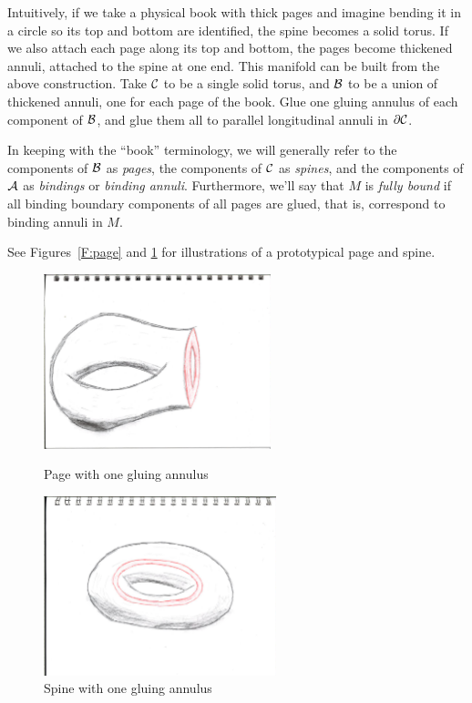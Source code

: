 Intuitively, if we take a physical book with thick pages and imagine bending it
in a circle so its top and bottom are identified, the spine becomes a solid
torus.  If we also attach each page along its top and bottom, the pages become
thickened annuli, attached to the spine at one end. This manifold can be built
from the above construction. Take $\mathcal{C}$ to be a single solid torus, and $\mathcal{B}$
to be a union of thickened annuli, one for each page of the book. Glue one
gluing annulus of each component of $\mathcal{B}$, and glue them all to parallel
longitudinal annuli in $\partial \mathcal{C}$.

\begin{defn}

In keeping with the ``book'' terminology, we will generally refer to the
components of $\mathcal{B}$ as \emph{pages}, the components of $\mathcal{C}$ as \emph{spines},
and the components of $\mathcal{A}$ as \emph{bindings} or \emph{binding annuli}.
Furthermore, we'll say that $M$ is \emph{fully bound} if all binding boundary
components of all pages are glued, that is, correspond to binding annuli in
$M$.

\end{defn}

See Figures~\ref{F:page} and \ref{F:spine} for illustrations of a prototypical
page and spine.

\begin{figure}
\noindent
    \begin{minipage}{0.45\textwidth}
        \noindent
        \includegraphics[width=\textwidth,height=2in]{fig-page}
        \caption{Page with one gluing annulus}
        \label{F:page}
    \end{minipage}\hfill
    \begin{minipage}{0.45\textwidth}
        \noindent
        \includegraphics[width=\textwidth,height=2.05in]{fig-spine}
        \caption{Spine with one gluing annulus}
        \label{F:spine}
    \end{minipage}
\end{figure}

